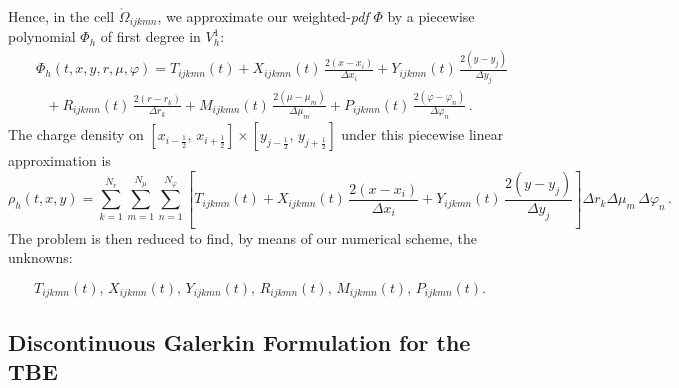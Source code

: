 \documentclass[11pt]{article}
\newcommand{\ot}{\frac{1}{2}}
\begin{document}
Hence, in the cell $\mathring{\Omega}_{ijkmn}$, we approximate our weighted-\emph{pdf} $\Phi$ by a  
piecewise polynomial $\Phi_h$ of first degree in $V^1_h$: 
%
\begin{eqnarray}
&&
\Phi_h (t,x,y,r,\mu,\varphi) = T_{ijkmn}(t) +  
X_{ijkmn}(t) \, \frac{2(x - x_{i})}{\Delta x_{i}} + 
Y_{ijkmn}(t) \, \frac{2(y - y_{j})}{\Delta y_{j}}  \nonumber
\\
&& 
\mbox{ } +
R_{ijkmn}(t) \, \frac{2(r - r_{k})}{\Delta r_{k}} +
M_{ijkmn}(t) \, \frac{2(\mu - \mu_{m})}{\Delta \mu_{m}} +
P_{ijkmn}(t) \, \frac{2(\varphi - \varphi_{n})}{\Delta \varphi_{n}} \, .
\end{eqnarray}
%
The charge density 
on $\left[ x_{i - \ot} , \, x_{i + \ot} \right] \times
                  \left[ y_{j - \ot} , \, y_{j + \ot} \right]$
under this piecewise linear approximation   is
%
\begin{equation}
\rho_h(t,x,y)=\sum_{k=1}^{N_{r}} \sum_{m=1}^{N_{\mu}} \sum_{n=1}^{N_{\varphi}}
\left[ T_{ijkmn}(t) +   X_{ijkmn}(t) \, \frac{2(x - x_{i})}{\Delta x_{i}} 
+ Y_{ijkmn}(t) \, \frac{2(y - y_{j})}{\Delta y_{j}} 
\right] \Delta r_{k} \Delta \mu_{m} \, \Delta \varphi_{n} \, .
\label{dg-density} 
\end{equation}
%
%
The problem is then reduced to find, by means of our numerical scheme, the unknowns: 

\begin{equation}
T_{ijkmn}(t), \,   
X_{ijkmn}(t), \, 
Y_{ijkmn}(t), \, 
R_{ijkmn}(t), \, 
M_{ijkmn}(t), \, 
P_{ijkmn}(t). \label{unknowns}
\end{equation}






\subsection{Discontinuous Galerkin Formulation for the TBE}
\label{sec:weakform}
\end{document}
